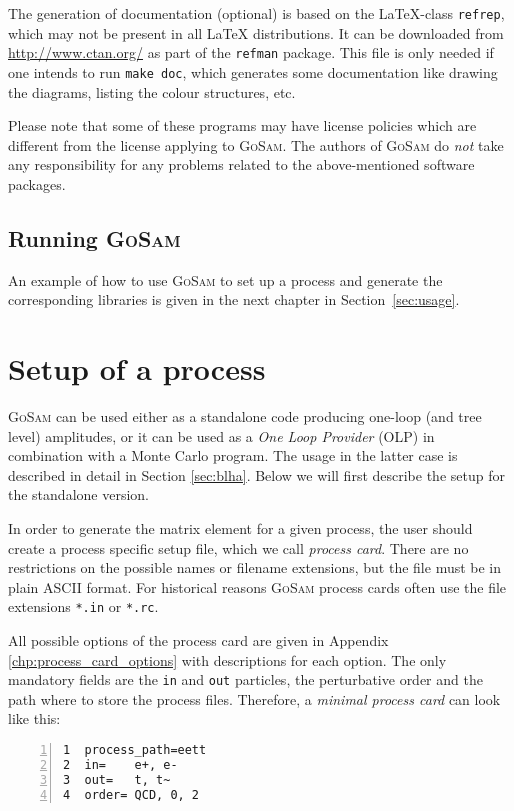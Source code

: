 \documentclass[11pt,a4paper]{refrep}
\newcommand{\gosamversion}{{3{.}0}}
\newcommand{\gosam}{\textsc{GoSam}\xspace}
\newcommand{\gosamv}[1][\gosamversion]{\textsc{GoSam}\xspace}
\begin{document}
 The generation of documentation (optional)
is based on the \LaTeX-class \texttt{refrep}, which may not be
present in all \LaTeX{}
distributions. It can be downloaded from \url{http://www.ctan.org/}
as part of the \texttt{refman} package.
This file is only needed if one intends to run \texttt{make doc},
which generates some documentation like drawing the diagrams, 
listing the colour structures, etc.

\attention Please note that some of these programs may have
license policies which are different from the license
applying to \gosamv. The authors of \gosamv do \emph{not}
take any responsibility for any problems related to the
above-mentioned software packages.


\section{Running \gosam}
An example of how to use \gosam to set up a process and generate the corresponding libraries is given in the next chapter in Section~\ref{sec:usage}.


\chapter{Setup of a process}
\label{chp:setup-of-a-process}


\gosam{} can be used either as a standalone code producing one-loop 
(and tree level) amplitudes, or it can be used as a {\it One Loop Provider} (OLP)
in combination with a Monte Carlo program. 
The usage in the latter case is described in detail in Section \ref{sec:blha}. 
Below we will first describe the setup for the standalone version.


In order to generate the matrix element for a given process, the user should
create a process specific setup file, which we call {\em process card}. There
are no restrictions on the possible names or filename extensions, but the file
must be in plain ASCII format. For historical reasons \gosam process cards often
use the file extensions \texttt{*.in} or \texttt{*.rc}.

All possible options of the process card are given in Appendix \ref{chp:process_card_options} with descriptions for each option.
The only mandatory fields are the {\tt in} and {\tt out} 
particles, the perturbative order and the path where to store the process files.
Therefore, a {\em minimal process card} can look like this:
\begin{lstlisting}[gobble=3,%
     numbers=left,caption={{\tt eett.in}},%
     basicstyle=\ttfamily]
1  process_path=eett
2  in=    e+, e-
3  out=   t, t~
4  order= QCD, 0, 2
\end{lstlisting}
\end{document}
